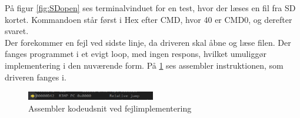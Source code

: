 På figur \ref{fig:SDopen} ses terminalvinduet for en test, hvor der læses en fil fra SD kortet. Kommandoen står først i Hex efter CMD, hvor 40 er CMD0, og derefter svaret.\\ 
Der forekommer en fejl ved sidste linje, da driveren skal åbne og læse filen. Der fanges programmet i et evigt loop, med ingen respons, hvilket umuliggør implementering i den nuværende form. På \ref{fig:SDprison} ses assembler instruktionen, som driveren fanges i.

\begin{figure}[H]
	\center
	\includegraphics[width=0.5\textwidth]{Figur/SDopenPrison.png}
	\caption{Assembler kodeudsnit ved fejlimplementering}
	\label{fig:SDprison}
\end{figure}
